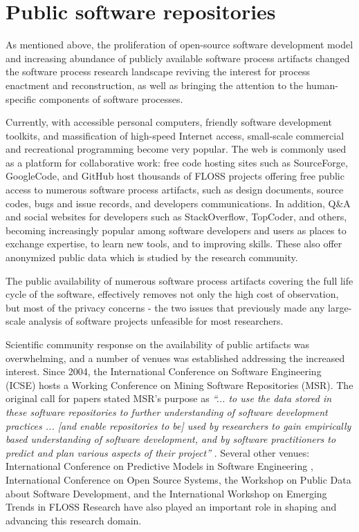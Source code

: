 %
%
\section{Public software repositories}\label{section_public_repositories}
As mentioned above, the proliferation of open-source software development model and increasing abundance of 
publicly available software process artifacts changed the software process research landscape reviving the 
interest for process enactment and reconstruction, as well as bringing the attention to the human-specific 
components of software processes. 

Currently, with accessible personal computers, friendly software development toolkits, and massification of 
high-speed Internet access, small-scale commercial and recreational programming become very popular. 
The web is commonly used as a platform for collaborative work: free code hosting sites such as SourceForge, 
GoogleCode, and GitHub host thousands of FLOSS projects offering free public access to numerous software 
process artifacts, such as design documents, source codes, bugs and issue records, and developers communications.
In addition, Q\&A and social websites for developers such as StackOverflow, TopCoder, and others, becoming 
increasingly popular among software developers and users as places to exchange expertise, to learn new tools, 
and to improving skills. These also offer anonymized public data which is studied by the research community.

The public availability of numerous software process artifacts covering the full life cycle of the software,
effectively removes not only the high cost of observation, but most of the privacy concerns - the two issues 
that previously made any large-scale analysis of software projects unfeasible for most researchers.

Scientific community response on the availability of public artifacts was overwhelming, and a number of 
venues was established addressing the increased interest. 
Since 2004, the International Conference on Software Engineering (ICSE) hosts a Working Conference on 
Mining Software Repositories (MSR). The original call for papers stated MSR's purpose as 
\textit{``... to use the data stored in these software repositories to further understanding of software 
development practices ... [and enable repositories to be] used by researchers to gain empirically based 
understanding of software development, and by software practitioners to predict and plan various aspects 
of their project''} \cite{msr2004} \cite{citeulike:7853299}. 
Several other venues: International Conference on Predictive Models in Software Engineering \cite{promise12}, 
International Conference on Open Source Systems, the Workshop on Public Data about Software Development, 
and the International Workshop on Emerging Trends in FLOSS Research have also played
an important role in shaping and advancing this research domain.


